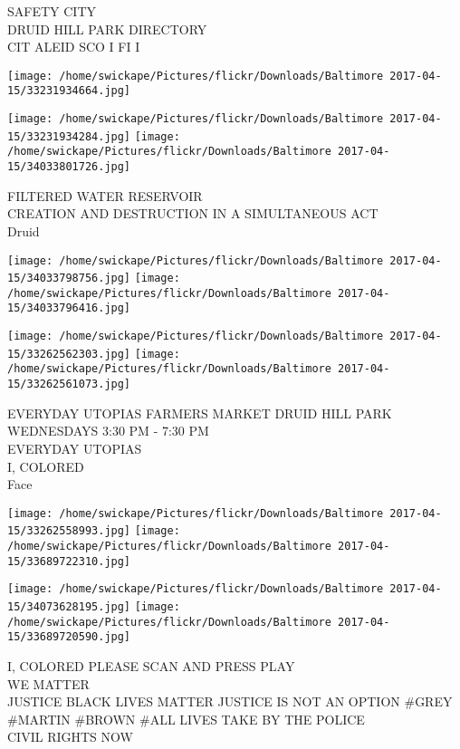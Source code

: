 \documentclass[10pt,letterpaper]{article}
\begin{document}
SAFETY CITY\\
DRUID HILL PARK DIRECTORY\\
CIT ALEID SCO I FI I\\
\pagebreak

\texttt{[image: /home/swickape/Pictures/flickr/Downloads/Baltimore 2017-04-15/33231934664.jpg]}

\vspace{0.25in}
\texttt{[image: /home/swickape/Pictures/flickr/Downloads/Baltimore 2017-04-15/33231934284.jpg]}
\texttt{[image: /home/swickape/Pictures/flickr/Downloads/Baltimore 2017-04-15/34033801726.jpg]}

FILTERED WATER RESERVOIR\\
CREATION AND DESTRUCTION IN A SIMULTANEOUS ACT\\
Druid\\
\pagebreak

\texttt{[image: /home/swickape/Pictures/flickr/Downloads/Baltimore 2017-04-15/34033798756.jpg]}
\texttt{[image: /home/swickape/Pictures/flickr/Downloads/Baltimore 2017-04-15/34033796416.jpg]}

\texttt{[image: /home/swickape/Pictures/flickr/Downloads/Baltimore 2017-04-15/33262562303.jpg]}
\texttt{[image: /home/swickape/Pictures/flickr/Downloads/Baltimore 2017-04-15/33262561073.jpg]}

EVERYDAY UTOPIAS FARMERS MARKET DRUID HILL PARK WEDNESDAYS 3:30 PM {-} 7:30 PM\\
EVERYDAY UTOPIAS\\
I, COLORED\\
Face\\
\pagebreak

\texttt{[image: /home/swickape/Pictures/flickr/Downloads/Baltimore 2017-04-15/33262558993.jpg]}
\texttt{[image: /home/swickape/Pictures/flickr/Downloads/Baltimore 2017-04-15/33689722310.jpg]}

\texttt{[image: /home/swickape/Pictures/flickr/Downloads/Baltimore 2017-04-15/34073628195.jpg]}
\texttt{[image: /home/swickape/Pictures/flickr/Downloads/Baltimore 2017-04-15/33689720590.jpg]}

I, COLORED PLEASE SCAN AND PRESS PLAY\\
WE MATTER\\
JUSTICE BLACK LIVES MATTER JUSTICE IS NOT AN OPTION \#GREY \#MARTIN \#BROWN \#ALL LIVES TAKE BY THE POLICE\\
CIVIL RIGHTS NOW\\
\pagebreak
\end{document}
